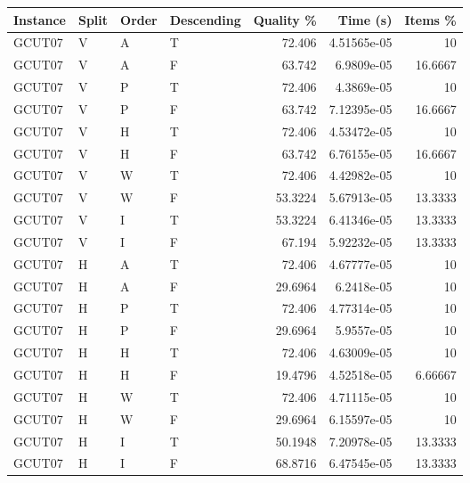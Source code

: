 \begin{tabular}{llllrrr}
    \hline
    Instance & Split & Order & Descending & Quality \% & Time (s)    & Items \% \\
    \hline
    GCUT07   & V     & A     & T          & 72.406     & 4.51565e-05 & 10       \\
    GCUT07   & V     & A     & F          & 63.742     & 6.9809e-05  & 16.6667  \\
    GCUT07   & V     & P     & T          & 72.406     & 4.3869e-05  & 10       \\
    GCUT07   & V     & P     & F          & 63.742     & 7.12395e-05 & 16.6667  \\
    GCUT07   & V     & H     & T          & 72.406     & 4.53472e-05 & 10       \\
    GCUT07   & V     & H     & F          & 63.742     & 6.76155e-05 & 16.6667  \\
    GCUT07   & V     & W     & T          & 72.406     & 4.42982e-05 & 10       \\
    GCUT07   & V     & W     & F          & 53.3224    & 5.67913e-05 & 13.3333  \\
    GCUT07   & V     & I     & T          & 53.3224    & 6.41346e-05 & 13.3333  \\
    GCUT07   & V     & I     & F          & 67.194     & 5.92232e-05 & 13.3333  \\
    GCUT07   & H     & A     & T          & 72.406     & 4.67777e-05 & 10       \\
    GCUT07   & H     & A     & F          & 29.6964    & 6.2418e-05  & 10       \\
    GCUT07   & H     & P     & T          & 72.406     & 4.77314e-05 & 10       \\
    GCUT07   & H     & P     & F          & 29.6964    & 5.9557e-05  & 10       \\
    GCUT07   & H     & H     & T          & 72.406     & 4.63009e-05 & 10       \\
    GCUT07   & H     & H     & F          & 19.4796    & 4.52518e-05 & 6.66667  \\
    GCUT07   & H     & W     & T          & 72.406     & 4.71115e-05 & 10       \\
    GCUT07   & H     & W     & F          & 29.6964    & 6.15597e-05 & 10       \\
    GCUT07   & H     & I     & T          & 50.1948    & 7.20978e-05 & 13.3333  \\
    GCUT07   & H     & I     & F          & 68.8716    & 6.47545e-05 & 13.3333  \\

\end{tabular}
